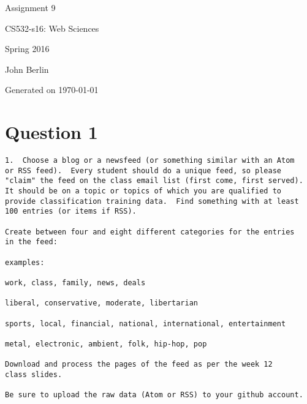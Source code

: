 \documentclass[letterpaper,10pt]{article}
\begin{document}
 

\begin{titlepage}

\begin{center}

\Huge{Assignment 9}

\Large{CS532-s16:  Web Sciences}

\Large{Spring 2016}

\Large{John Berlin}

\Large Generated on \today

\end{center}

\end{titlepage}
\newpage
\listoffigures
  \listoftables
\newpage
{}
\printindex
\newpage
\section*{Question 1}

\begin{verbatim}
1.  Choose a blog or a newsfeed (or something similar with an Atom
or RSS feed).  Every student should do a unique feed, so please
"claim" the feed on the class email list (first come, first served).
It should be on a topic or topics of which you are qualified to
provide classification training data.  Find something with at least
100 entries (or items if RSS).

Create between four and eight different categories for the entries
in the feed:

examples: 

work, class, family, news, deals

liberal, conservative, moderate, libertarian

sports, local, financial, national, international, entertainment

metal, electronic, ambient, folk, hip-hop, pop

Download and process the pages of the feed as per the week 12 
class slides.

Be sure to upload the raw data (Atom or RSS) to your github account.
\end{verbatim}
\end{document}
